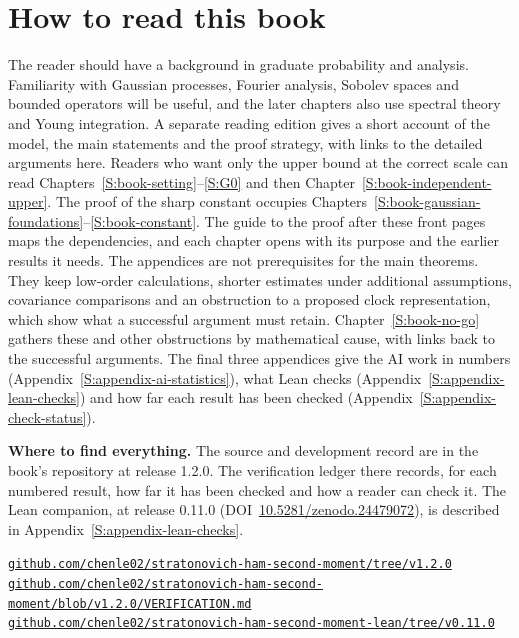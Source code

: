 \section*{How to read this book}

The reader should have a background in graduate probability and analysis.
Familiarity with Gaussian processes, Fourier analysis, Sobolev spaces and
bounded operators will be useful, and the later chapters also use spectral
theory and Young integration. A separate reading edition gives a short account
of the model, the main statements and the proof strategy, with links to the
detailed arguments here. Readers who want only the upper bound at the correct
scale can read Chapters~\ref{S:book-setting}--\ref{S:G0} and then
Chapter~\ref{S:book-independent-upper}. The proof of the sharp constant occupies
Chapters~\ref{S:book-gaussian-foundations}--\ref{S:book-constant}. The guide to
the proof after these front pages maps the dependencies, and each chapter opens
with its purpose and the earlier results it needs. The appendices are not
prerequisites for the main theorems. They keep low-order calculations, shorter
estimates under additional assumptions, covariance comparisons and an
obstruction to a proposed clock representation, which show what a successful
argument must retain. Chapter~\ref{S:book-no-go} gathers these and other
obstructions by mathematical cause, with links back to the successful
arguments. The final three appendices give the AI work in numbers
(Appendix~\ref{S:appendix-ai-statistics}), what Lean checks
(Appendix~\ref{S:appendix-lean-checks}) and how far each result has been
checked (Appendix~\ref{S:appendix-check-status}).

\medskip
\noindent\textbf{Where to find everything.} The source and development record
are in the book's repository at release 1.2.0. The verification ledger there
records, for each numbered result, how far it has
been checked and how a reader can check it. The Lean companion, at release
0.11.0 (DOI~\href{https://doi.org/10.5281/zenodo.24479072}{10.5281/zenodo.24479072}), is described in
Appendix~\ref{S:appendix-lean-checks}.
\begin{center}\footnotesize
\href{https://github.com/chenle02/stratonovich-ham-second-moment/tree/v1.2.0}{\nolinkurl{github.com/chenle02/stratonovich-ham-second-moment/tree/v1.2.0}}\\
\href{https://github.com/chenle02/stratonovich-ham-second-moment/blob/v1.2.0/VERIFICATION.md}{\nolinkurl{github.com/chenle02/stratonovich-ham-second-moment/blob/v1.2.0/VERIFICATION.md}}\\
\href{https://github.com/chenle02/stratonovich-ham-second-moment-lean/tree/v0.11.0}{\nolinkurl{github.com/chenle02/stratonovich-ham-second-moment-lean/tree/v0.11.0}}
\end{center}


